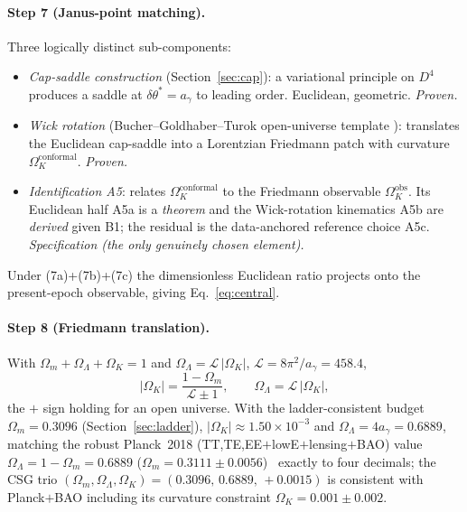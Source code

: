 \documentclass[11pt,a4paper]{article}
\theoremstyle{plain}
\theoremstyle{definition}
\theoremstyle{remark}
\newcommand{\Ok}{\Omega_K}
\newcommand{\OL}{\Omega_\Lambda}
\newcommand{\Om}{\Omega_m}
\newcommand{\ag}{a_\gamma}
\newcommand{\Lb}{\mathcal{L}}
\newcommand{\dtheta}{\delta\theta}
\begin{document}
\paragraph{Step 7 (Janus-point matching).} Three logically distinct sub-components:
\begin{itemize}[leftmargin=*,nosep]
\item[(7a)] \emph{Cap-saddle construction} (Section~\ref{sec:cap}): a variational principle on
$D^4$ produces a saddle at $\dtheta^* = \ag$ to leading order. Euclidean, geometric. \emph{Proven.}
\item[(7b)] \emph{Wick rotation} (Bucher--Goldhaber--Turok open-universe template
\cite{BGT1995,HawkingTurok1998}): translates the Euclidean cap-saddle into a Lorentzian
Friedmann patch with curvature $\Ok^{\mathrm{conformal}}$. \emph{Proven.}
\item[(7c)] \emph{Identification A5}: relates $\Ok^{\mathrm{conformal}}$ to the Friedmann
observable $\Ok^{\mathrm{obs}}$. Its Euclidean half A5a is a \emph{theorem} and the Wick-rotation
kinematics A5b are \emph{derived} given B1; the residual is the data-anchored reference choice
A5c. \emph{Specification (the only genuinely chosen element).}
\end{itemize}
Under (7a)+(7b)+(7c) the dimensionless Euclidean ratio projects onto the present-epoch
observable, giving Eq.~\eqref{eq:central}.

\paragraph{Step 8 (Friedmann translation).} With $\Om + \OL + \Ok = 1$ and
$\OL = \Lb\,|\Ok|$, $\Lb = 8\pi^2/\ag = 458.4$,
\begin{equation}
\label{eq:OK}
|\Ok| = \frac{1 - \Om}{\Lb \pm 1}, \qquad \OL = \Lb\,|\Ok|,
\end{equation}
the $+$ sign holding for an open universe. With the ladder-consistent budget $\Om = 0.3096$
(Section~\ref{sec:ladder}), $|\Ok| \approx 1.50\times10^{-3}$ and $\OL = 4\ag = 0.6889$, matching
the robust Planck~2018 (TT,TE,EE$+$lowE$+$lensing$+$BAO) value $\OL = 1-\Om = 0.6889$
($\Om = 0.3111\pm0.0056$)~\cite{Planck2018} exactly to four decimals; the CSG trio
$(\Om,\OL,\Ok) = (0.3096,\,0.6889,\,+0.0015)$ is consistent with Planck$+$BAO including its
curvature constraint $\Ok = 0.001\pm0.002$.
\end{document}
